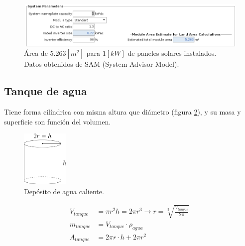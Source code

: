 \begin{figure}[h] \centering
	\centering
	\includegraphics[width=1\textwidth]{./capitulos/resultados_discusion/images/solar_panel_area.png}
	\caption{Área de $5.263[m^2]$ para $1[kW]$ de paneles solares instalados. Datos obtenidos de SAM (System Advisor Model).}
	\label{fig:solar_panel_area}
\end{figure}


\subsection{Tanque de agua}

Tiene forma cilíndrica con misma altura que diámetro (figura
\ref{fig:water_tank}), y su masa y superficie son función del volumen.

\begin{figure}[h] \centering
	\centering
	\includegraphics[width=0.2\textwidth]{./capitulos/resultados_discusion/images/water_tank.png}
	\caption{Depósito de agua caliente.}
	\label{fig:water_tank}
\end{figure}

\begin{align} \label{eq:tank_mass_and_area}
	V_{tanque} & = \pi r^2 h = 2 \pi r^3 \rightarrow r = \sqrt[3]{\frac{V_{tanque}}{2\pi}} \\
	m_{tanque} & = V_{tanque} \cdot \rho_{agua} \\
	A_{tanque} & = 2 \pi r \cdot h + 2 \pi r^2
\end{align}
